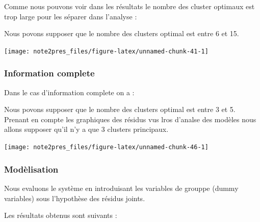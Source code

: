 \documentclass[11pt,]{article}
\begin{document}
Comme nous pouvons voir dans les résultats le nombre des cluster
optimaux est trop large pour les séparer dans l'analyse :

Nous povons supposer que le nombre des clusters optimal est entre 6 et
15.

\FloatBarrier

\begin{center}\texttt{[image: note2pres\_files/figure-latex/unnamed-chunk-41-1]} \end{center}

\FloatBarrier

\hypertarget{information-complete}{%
\subsubsection{Information complete}\label{information-complete}}

Dans le cas d'information complete on a :

Nous povons supposer que le nombre des clusters optimal est entre 3 et
5. Prenant en compte les graphiques des résidus vus lros d'analse des
modèles nous allons supposer qu'il n'y a que 3 clusters principaux.

\FloatBarrier

\begin{center}\texttt{[image: note2pres\_files/figure-latex/unnamed-chunk-46-1]} \end{center}

\FloatBarrier

\hypertarget{modelisation-1}{%
\subsubsection{Modèlisation}\label{modelisation-1}}

\FloatBarrier

Nous evaluons le système en introduisant les variables de grouppe (dummy
variables) sous l'hypothèse des résidus joints.

Les résultats obtenus sont suivants :

\FloatBarrier
\end{document}
